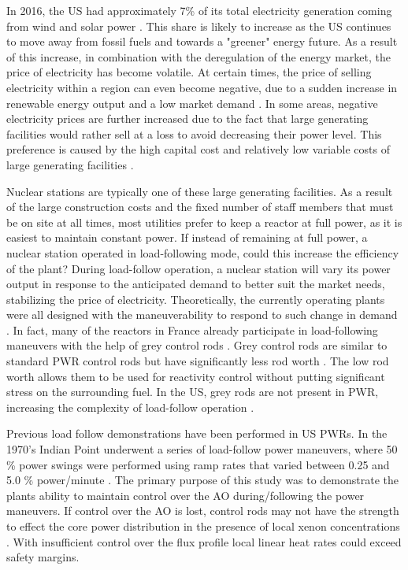 \documentclass[edeposit,fullpage,11pt]{uiucthesis2009}
\begin{document}
In 2016, the \gls{US} had approximately 7\% of its total electricity generation coming from wind and solar power \cite{u.s_energy_information_administration_electricity_2016}. 
This share is likely to increase as the \gls{US} continues to move away from fossil fuels and towards a "greener" energy future.
As a result of this increase, in combination with the deregulation of the energy market, the price of electricity has become volatile. 
At certain times, the price of selling electricity within a region can even become negative, due to a sudden increase in renewable energy output and a low market demand \cite{paraschiv_impact_2014}. 
In some areas, negative electricity prices are further increased due to the fact that large generating facilities would rather sell at a loss to avoid decreasing their power level. 
This preference is caused by the high capital cost and relatively low variable costs of large generating facilities \cite{lokhov_load-following_2011}.

Nuclear stations are typically one of these large generating facilities.
As a result of the large construction costs and the fixed number of staff members that must be on site at all times, most utilities prefer to keep a reactor at full power, as it is easiest to maintain constant power. 
If instead of remaining at full power, a nuclear station operated in load-following mode, could this increase the efficiency of the plant?
During load-follow operation, a nuclear station will vary its power output in response to the anticipated demand to better suit the market needs, stabilizing the price of electricity.
Theoretically, the currently operating plants were all designed with the maneuverability to respond to such change in demand \cite{lokhov_technical_2011}.
In fact, many of the reactors in France already participate in load-following maneuvers with the help of grey control rods \cite{lokhov_technical_2011}.
Grey control rods are similar to standard \gls{PWR} control rods but have significantly less rod worth \cite{yousefpour_improvement_2000}.
The low rod worth allows them to be used for reactivity control without putting significant stress on the surrounding fuel. 
In the \gls{US}, grey rods are not present in \gls{PWR}, increasing the complexity of load-follow operation \cite{lokhov_technical_2011}.
  
Previous load follow demonstrations have been performed in \gls{US} \gls{PWR}s.
In the 1970's Indian Point underwent a series of load-follow power maneuvers, where 50 \% power swings were performed using ramp rates that varied between 0.25 and 5.0 \% power/minute \cite{sipush_load-follow_1976}.
The primary purpose of this study was to demonstrate the plants ability to maintain control over the \gls{AO} during/following the power maneuvers. 
If control over the \gls{AO} is lost, control rods may not have the strength to effect the core power distribution in the presence of local xenon concentrations \cite{sipush_load-follow_1976}.
With insufficient control over the flux profile local linear heat rates could exceed safety margins.
\end{document}
